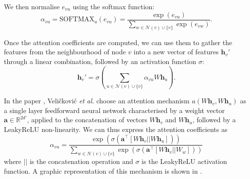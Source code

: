 \documentclass[12pt,a4paper]{report}
\theoremstyle{definition}
\begin{document}
We then normalise $e_{vu}$ using the softmax function:
\begin{equation*}
    \alpha _{vu} = \text{SOFTMAX}_u (e_{vu}) = \frac{\exp (e_{vu})}{\sum _{w \in \mathcal{N}(v) \cup \{v\}} \exp (e_{vw})} .
\end{equation*}

Once the attention coefficients are computed, we can use them to gather the features from the neighbourhood of node $v$ into a new vector of features $\textbf{h}_v '$ through a linear combination, followed by an activation function $\sigma$:
\begin{equation*}
    \textbf{h}_v ' = \sigma \left( \sum_{u \in \mathcal{N}(v) \cup \{v\}} \alpha_{vu} W \textbf{h}_u \right) .
\end{equation*}

In the paper \cite{GATs}, Veličković \textit{et al.} choose an attention mechanism $a(W \textbf{h}_v, W \textbf{h}_u)$ as a single layer feedforward neural network characterised by a weight vector $\textbf{a} \in \mathbb{R}^{2 d'}$, applied to the concatenation of vectors $W \textbf{h}_v$ and $W \textbf{h}_u$, followed by a LeakyReLU non-linearity.
We can thus express the attention coefficients as
\begin{equation*}
    \alpha _{vu} = \frac{\exp \left( \sigma \left( \textbf{a}^{\top} [ W \textbf{h}_v || W \textbf{h}_u ] \right) \right)}
    {\sum _{w \in \mathcal{N}(v) \cup \{v\}} \exp \left( \sigma \left( \textbf{a}^{\top} [W \textbf{h}_v || W \textbf{}_w ] \right) \right)}
\end{equation*}
where $||$ is the concatenation operation and $\sigma$ is the LeakyReLU activation function.
A graphic representation of this mechanism is shown in .
\end{document}

